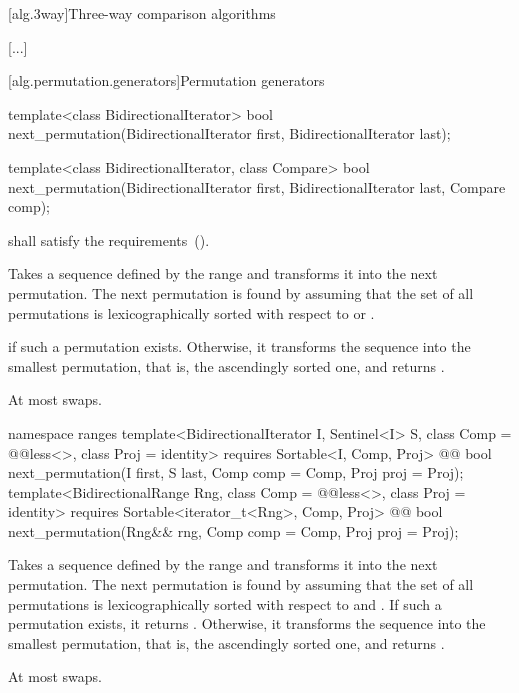 [alg.3way]{Three-way comparison algorithms}

[...]

[alg.permutation.generators]{Permutation generators}

%
\begin{itemdecl}
template<class BidirectionalIterator>
  bool next_permutation(BidirectionalIterator first,
                        BidirectionalIterator last);

template<class BidirectionalIterator, class Compare>
  bool next_permutation(BidirectionalIterator first,
                        BidirectionalIterator last, Compare comp);
\end{itemdecl}

\begin{itemdescr}
\pnum
\requires
{} shall satisfy the
 requirements~().

\pnum
\effects
Takes a sequence defined by the range
and transforms it into the next permutation.
The next permutation is found by assuming that the set of all permutations is
lexicographically sorted with respect to
or .

\pnum
\returns
{}
if such a permutation exists.
Otherwise, it transforms the sequence into the smallest permutation,
that is, the ascendingly sorted one, and returns
.

\pnum
\complexity
At most
swaps.
\end{itemdescr}

\begin{addedblock}
%
\begin{itemdecl}
namespace ranges {
  template<BidirectionalIterator I, Sentinel<I> S, class Comp = @@less<>,
      class Proj = identity>
    requires Sortable<I, Comp, Proj>
    @@ bool
      next_permutation(I first, S last, Comp comp = Comp{}, Proj proj = Proj{});
  template<BidirectionalRange Rng, class Comp = @@less<>,
      class Proj = identity>
    requires Sortable<iterator_t<Rng>, Comp, Proj>
    @@ bool
      next_permutation(Rng&& rng, Comp comp = Comp{}, Proj proj = Proj{});
}
\end{itemdecl}

\begin{itemdescr}
\pnum
\effects
Takes a sequence defined by the range
and transforms it into the next permutation.
The next permutation is found by assuming that the set of all permutations is
lexicographically sorted with respect to
 and .
If such a permutation exists, it returns
.
Otherwise, it transforms the sequence into the smallest permutation,
that is, the ascendingly sorted one, and returns
.

\pnum
\complexity
At most
swaps.
\end{itemdescr}
\end{addedblock}

